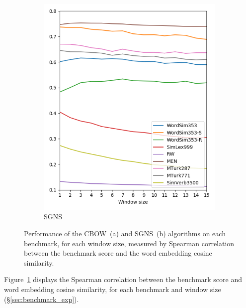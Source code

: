 \documentclass[11pt,a4paper]{article}
\begin{document}
\begin{figure}[t]
\begin{subfigure}[b]{\columnwidth}
        \includegraphics[width=\columnwidth]{figs/similarities_fasttext_enwiki-20170501-clean_skipgram-300d-min500_eval.png}
        \caption{SGNS}
        \end{subfigure}
        \caption{Performance of the CBOW~(a) and SGNS~(b) algorithms on each benchmark,
        for each window size,
        measured by Spearman correlation between the benchmark score
        and the word embedding cosine similarity.
        \label{fig:benchmark_correlation}}
    \end{figure}

    Figure~\ref{fig:benchmark_correlation} displays the Spearman correlation
    between the benchmark score and word embedding cosine similarity,
    for each benchmark and window size (\S\ref{sec:benchmark_exp}).
\end{document}
